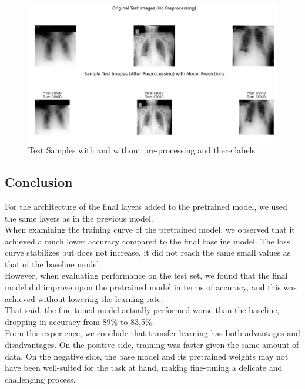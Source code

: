 \documentclass[conference]{IEEEtran}
\begin{document}
\begin{figure}[htbp]
	\centerline{\includegraphics[width=\linewidth]{Images/Transferlearning_4.png}}
	\caption{Test Samples with and without pre-processing and there labels}
	\label{fig:transferlearning_4}
\end{figure}


\subsection{Conclusion}
For the architecture of the final layers added to the pretrained model, we used the same layers as in the previous model.\\

When examining the training curve of the pretrained model, we observed that it achieved a much lower accuracy compared to the final baseline model. The loss curve stabilizes but does not increase, it did not reach the same small values as that of the baseline model.\\

However, when evaluating performance on the test set, we found that the final model did improve upon the pretrained model in terms of accuracy, and this was achieved without lowering the learning rate.\\
That said, the fine-tuned model actually performed worse than the baseline, dropping in accuracy from 89\% to 83,5\%.\\

From this experience, we conclude that transfer learning has both advantages and disadvantages. On the positive side, training was faster given the same amount of data. On the negative side, the base model and its pretrained weights may not have been well-suited for the task at hand, making fine-tuning a delicate and challenging process.\\
\end{document}
